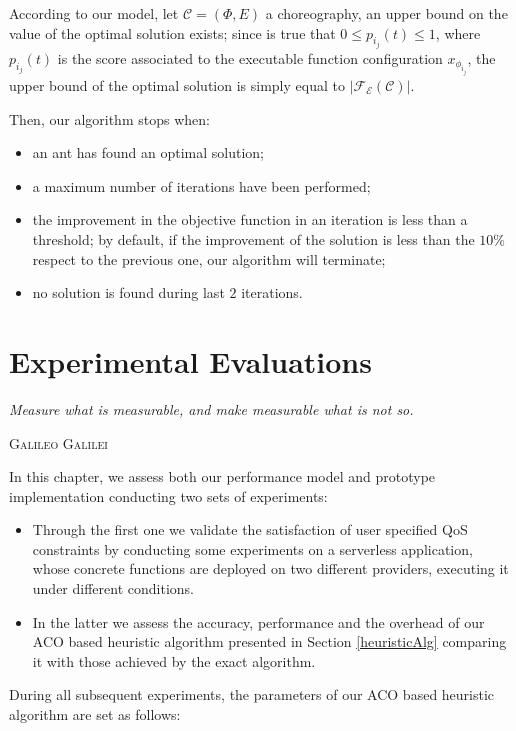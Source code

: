 \documentclass[12pt,a4paper]{report}
\begin{document}
According to our model, let $\mathcal{C} = (\Phi,E)$ a choreography, an upper bound on the value of the optimal solution exists; since is true that $0 \leq p_{i_j}(t) \leq 1$, where $p_{i_j}(t)$ is the score associated to the executable function configuration $x_{\phi_{i_j}}$, the upper bound of the optimal solution is simply equal to $|\mathscr{F_E}(\mathcal{C})|$.

Then, our algorithm stops when:

\begin{itemize}
	\item an ant has found an optimal solution;
	\item a maximum number of iterations have been performed;
	\item the improvement in the objective function in an iteration is less than a threshold; by default, if the improvement of the solution is less than the $10\%$ respect to the previous one, our algorithm will terminate;
	\item no solution is found during last $2$ iterations.
\end{itemize}


\newpage

\chapter{Experimental Evaluations}\label{chapterExperimental}

\epigraph{\itshape Measure what is measurable, and make measurable what is not so.}{\textsc{Galileo Galilei}}

In this chapter, we assess both our performance model and prototype implementation conducting two sets of experiments:

\begin{itemize}
	\item Through the first one we validate the satisfaction of user specified QoS constraints by conducting some experiments on a serverless application, whose concrete functions are deployed on two different providers, executing it under different conditions.

	\item In the latter we assess the accuracy, performance and the overhead of our ACO based heuristic algorithm presented in Section \ref{heuristicAlg} comparing it with those achieved by the exact algorithm.
\end{itemize}

During all subsequent experiments, the parameters of our ACO based heuristic algorithm are set as follows:
\end{document}
